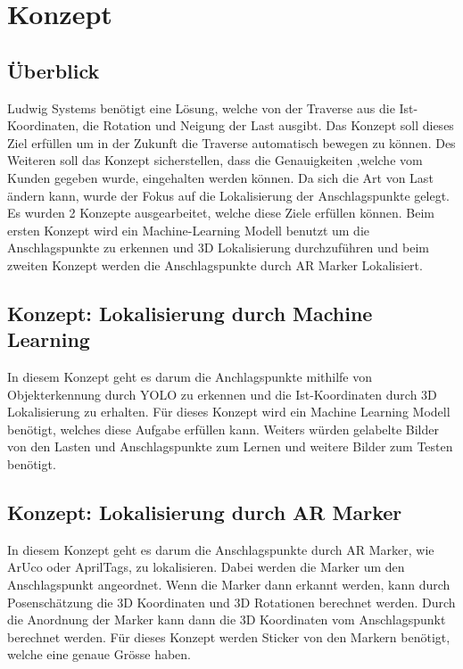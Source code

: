 \section{Konzept}


\subsection{Überblick}
Ludwig Systems benötigt eine Lösung, welche von der Traverse aus die Ist-Koordinaten, die Rotation und Neigung der Last ausgibt. Das Konzept soll dieses Ziel erfüllen um in der Zukunft die Traverse automatisch bewegen zu können. Des Weiteren soll das Konzept sicherstellen, dass die Genauigkeiten ,welche vom Kunden gegeben wurde, eingehalten werden können. 
Da sich die Art von Last ändern kann, wurde der Fokus auf die Lokalisierung der Anschlagspunkte gelegt. 
Es wurden 2 Konzepte ausgearbeitet, welche diese Ziele erfüllen können. Beim ersten Konzept wird ein Machine-Learning Modell benutzt um die Anschlagspunkte zu erkennen und 3D Lokalisierung durchzuführen und beim zweiten Konzept werden die Anschlagspunkte durch AR Marker 
Lokalisiert.


\subsection{Konzept: Lokalisierung durch Machine Learning}

In diesem Konzept geht es darum die Anchlagspunkte mithilfe von Objekterkennung durch YOLO zu erkennen und die Ist-Koordinaten durch 3D Lokalisierung zu erhalten. 
Für dieses Konzept wird ein Machine Learning Modell benötigt, welches diese Aufgabe erfüllen kann. 
Weiters würden gelabelte Bilder von den Lasten und Anschlagspunkte zum Lernen und weitere Bilder zum Testen benötigt.

\subsection{Konzept: Lokalisierung durch AR Marker}

In diesem Konzept geht es darum die Anschlagspunkte durch AR Marker, wie ArUco oder AprilTags, zu lokalisieren. Dabei werden die Marker um den Anschlagspunkt angeordnet. Wenn die Marker dann erkannt werden, kann durch Posenschätzung die 3D Koordinaten und 3D Rotationen berechnet werden. Durch die Anordnung der Marker kann dann die 3D Koordinaten vom Anschlagspunkt berechnet werden. 
Für dieses Konzept werden Sticker von den Markern benötigt, welche eine genaue Grösse haben. 

